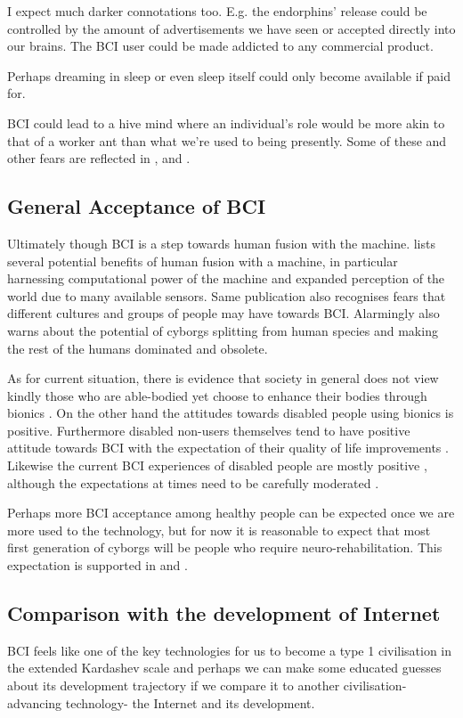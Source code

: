 \documentclass[fleqn,11pt]{olplainarticle}
\begin{document}
I expect much darker connotations too. E.g. the endorphins' release could be controlled by the amount of advertisements we have seen or accepted directly into our brains. The BCI user could be made addicted to any commercial product.

Perhaps dreaming in sleep or even sleep itself could only become available if paid for. 

BCI could lead to a hive mind where an individual's role would be more akin to that of a worker ant than what we're used to being presently. Some of these and other fears are reflected in \cite{liberatore_2021}, \cite{kogel2019using} and \cite{warwick2003cyborg}.

\subsection{General Acceptance of BCI}
Ultimately though BCI is a step towards human fusion with the machine. \cite{warwick2003cyborg} lists several potential benefits of human fusion with a machine, in particular harnessing computational power of the machine and expanded perception of the world due to many available sensors. Same publication also recognises fears that different cultures and groups of people may have towards BCI. Alarmingly \cite{warwick2003cyborg} also warns about the potential of cyborgs splitting from human species and making the rest of the humans dominated and obsolete.

As for current situation, there is evidence that society in general does not view kindly those who are able-bodied yet choose to enhance their bodies through bionics \cite {meyer2018disabled}. On the other hand the attitudes towards disabled people using bionics is positive. Furthermore disabled non-users themselves tend to have positive attitude towards BCI with the expectation of their quality of life improvements \cite{kogel2019using}. Likewise the current BCI experiences of disabled people are mostly positive \cite{kogel2020like}, although the expectations at times need to be carefully moderated \cite{glannon2014ethical}.

Perhaps more BCI acceptance among healthy people can be expected once we are more used to the technology, but for now it is reasonable to expect that most first generation of cyborgs will be people who require neuro-rehabilitation. This expectation is supported in \cite{schalk2008brain} and \cite{kogel2019using}.

\subsection{Comparison with the development of Internet}
BCI feels like one of the key technologies for us to become a type 1 civilisation in the extended Kardashev scale \cite{gray2020extended} and perhaps we can make some educated guesses about its development trajectory if we compare it to another civilisation-advancing technology- the Internet and its development.
\end{document}
